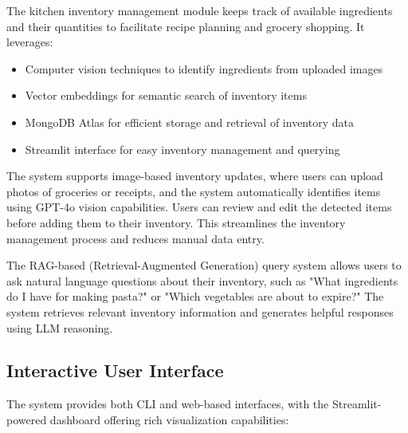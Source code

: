 \documentclass{ecai}
\begin{document}
The kitchen inventory management module keeps track of available ingredients and their quantities to facilitate recipe planning and grocery shopping. It leverages:

\begin{itemize}[noitemsep,topsep=0pt]
    \item Computer vision techniques to identify ingredients from uploaded images
    \item Vector embeddings for semantic search of inventory items
    \item MongoDB Atlas for efficient storage and retrieval of inventory data
    \item Streamlit interface for easy inventory management and querying
\end{itemize}

The system supports image-based inventory updates, where users can upload photos of groceries or receipts, and the system automatically identifies items using GPT-4o vision capabilities. Users can review and edit the detected items before adding them to their inventory. This streamlines the inventory management process and reduces manual data entry.

The RAG-based (Retrieval-Augmented Generation) query system allows users to ask natural language questions about their inventory, such as "What ingredients do I have for making pasta?" or "Which vegetables are about to expire?" The system retrieves relevant inventory information and generates helpful responses using LLM reasoning.

\subsection{Interactive User Interface}

The system provides both CLI and web-based interfaces, with the Streamlit-powered dashboard offering rich visualization capabilities:
\end{document}

